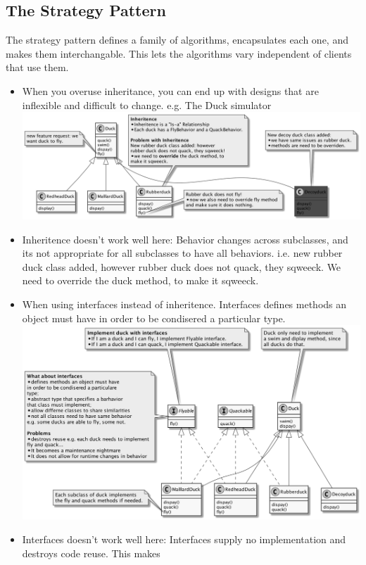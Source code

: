 \documentclass[11pt]{article}
\begin{document}
    \subsection{The Strategy Pattern}
    The strategy pattern defines a family of algorithms, encapsulates each one, and makes them interchangable. This lets
    the algorithms vary independent of clients that use them.
    \begin{itemize}
        \item When you overuse inheritance, you can end up with designs that are inflexible and difficult to change. e.g. The Duck simulator\\
        \includegraphics[scale=0.15]{strategy/1_duck_with_hierarchie}
        \item Inheritence doesn't work well here: Behavior changes across subclasses, and its not appropriate for all
        subclasses to have all behaviors. i.e. new rubber duck class added, however rubber duck does not quack, they sqweeck.
        We need to override the duck method, to make it sqweeck.
        \item When using interfaces instead of inheritence. Interfaces defines methods an object must have in order to
        be condisered a particular type.\\
        \includegraphics[scale=0.15]{strategy/2_duck_with_interfaces}
        \item Interfaces doesn't work well here: Interfaces supply no implementation and destroys code reuse. This makes

\end{itemize}
\end{document}
